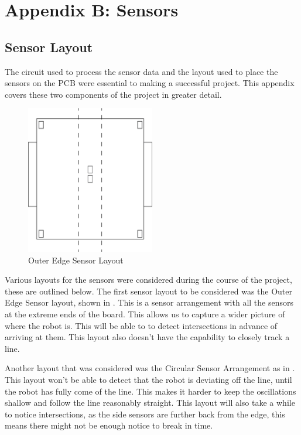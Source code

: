\documentclass{article}
\begin{document}
\vfill

\clearpage

\section{Appendix B: Sensors}

\subsection{Sensor Layout}

The circuit used to process the sensor data and the layout used to place the sensors on the PCB were essential to making a successful project. This appendix covers these two components of the project in greater detail.

\begin{figure}[!h]
\centerline{\includegraphics[width=0.5\textwidth]{outer_edge_sensor}}
\caption{Outer Edge Sensor Layout}
\label{fig:outer_edge_sensor}
\end{figure}

Various layouts for the sensors were considered during the course of the project, these are outlined below. The first sensor layout to be considered was the Outer Edge Sensor layout, shown in . This is a sensor arrangement with all the sensors at the extreme ends of the board. This allows us to capture a wider picture of where the robot is. This will be able to to detect intersections in advance of arriving at them. This layout also doesn't have the capability to closely track a line.

Another layout that was considered was the Circular Sensor Arrangement as in . This layout won't be able to detect that the robot is deviating off the line, until the robot has fully come of the line. This makes it harder to keep the oscillations shallow and follow the line reasonably straight. This layout will also take a while to notice intersections, as the side sensors are further back from the edge, this means there might not be enough notice to break in time.
\end{document}
